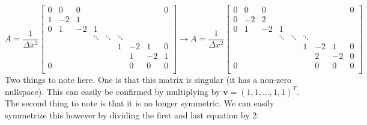 \documentclass[landscape]{article}
\begin{document}
\[ A = \frac{1}{\Delta x^2} \left[\begin{array}{ccccccccc}
0  & 0     & 0         &           &           &           &           &         &  0 \\
1  & -2    & 1         &           &           &           &           &         &    \\
0  & 1     & -2        & 1         &           &           &           &         &    \\
   &       &           & \ddots    & \ddots    & \ddots    &           &         &    \\
   &       &           &           &           & 1         & -2        & 1       &  0 \\
   &       &           &           &           &           &  1        & -2      &  1 \\
0  &       &           &           &           &           &  0        & 0       &  0 \\
\end{array} \right]
\rightarrow
A = \frac{1}{\Delta x^2} \left[\begin{array}{ccccccccc}
0  & 0     & 0         &           &           &           &           &         &  0 \\
0  & -2    & 2         &           &           &           &           &         &    \\
0  & 1     & -2        & 1         &           &           &           &         &    \\
   &       &           & \ddots    & \ddots    & \ddots    &           &         &    \\
   &       &           &           &           & 1         & -2        & 1       &  0 \\
   &       &           &           &           &           &  2        & -2      &  0 \\
0  &       &           &           &           &           &  0        & 0       &  0 \\
\end{array} \right]
\]
Two things to note here. One is that this matrix is singular (it has a non-zero nullspace). This can easily be confirmed by multiplying by $\mathbf{v} = (1,1,\dots,1,1)^T$. The second thing to note is that it is no longer symmetric. We can easily symmetrize this however by dividing the first and last equation by 2:
\end{document}
